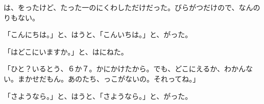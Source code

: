 は、をったけど、たった一のにくわしただけだった。びらがつだけので、なんのりもない。

「こんにちは。」と、はうと、「こんいちは。」と、がった。

「はどこにいますか。」と、はにねた。

「ひと？いるとう、６か７。かにかけたから。でも、どこにえるか、わかんない。まかせだもん。あのたち、っこがないの。それってね。」

「さようなら。」と、はうと、「さようなら。」と、がった。



